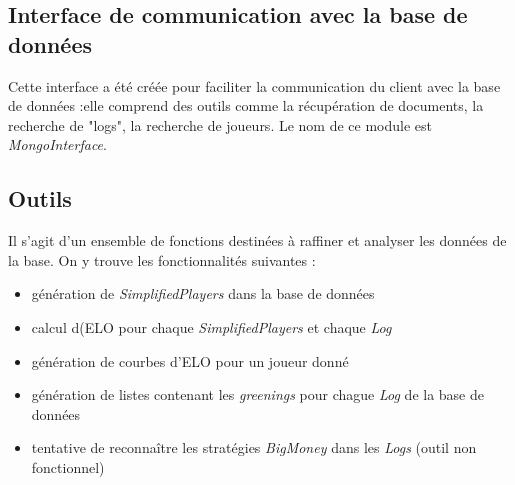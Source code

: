 
\subsection{Interface de communication avec la base de données}
Cette interface a été créée pour faciliter la communication du client avec la base de données :elle comprend des outils comme la récupération de documents, la recherche de "logs", la recherche de joueurs. Le nom de ce module est \textit{MongoInterface}.

\subsection{Outils}
Il s'agit d'un ensemble de fonctions destinées à raffiner et analyser les données de la base. On y trouve les fonctionnalités suivantes : 
\begin{itemize}
\item génération de \textit{SimplifiedPlayers} dans la base de données
\item calcul d(ELO pour chaque \textit{SimplifiedPlayers} et chaque \textit{Log}
\item génération de courbes d'ELO pour un joueur donné
\item génération de listes contenant les \textit{greenings} pour chague \textit{Log} de la base de données
\item tentative de reconnaître les stratégies \textit{BigMoney} dans les \textit{Logs} (outil non fonctionnel)
\end{itemize}

